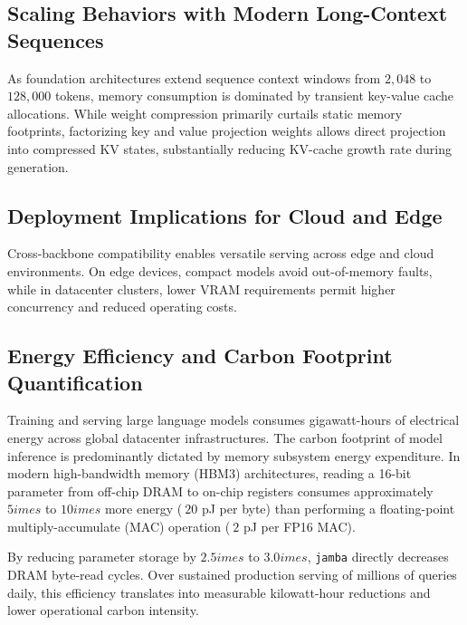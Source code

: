 \subsection{Scaling Behaviors with Modern Long-Context Sequences}
As foundation architectures extend sequence context windows from $2{,}048$ to $128{,}000$ tokens, memory consumption is dominated by transient key-value cache allocations. While weight compression primarily curtails static memory footprints, factorizing key and value projection weights allows direct projection into compressed KV states, substantially reducing KV-cache growth rate during generation.

\subsection{Deployment Implications for Cloud and Edge}
Cross-backbone compatibility enables versatile serving across edge and cloud environments. On edge devices, compact models avoid out-of-memory faults, while in datacenter clusters, lower VRAM requirements permit higher concurrency and reduced operating costs.

\subsection{Energy Efficiency and Carbon Footprint Quantification}
Training and serving large language models consumes gigawatt-hours of electrical energy across global datacenter infrastructures. The carbon footprint of model inference is predominantly dictated by memory subsystem energy expenditure. In modern high-bandwidth memory (HBM3) architectures, reading a 16-bit parameter from off-chip DRAM to on-chip registers consumes approximately $5	imes$ to $10	imes$ more energy ($~20$ pJ per byte) than performing a floating-point multiply-accumulate (MAC) operation ($~2$ pJ per FP16 MAC).

By reducing parameter storage by $2.5	imes$ to $3.0	imes$, \texttt{jamba} directly decreases DRAM byte-read cycles. Over sustained production serving of millions of queries daily, this efficiency translates into measurable kilowatt-hour reductions and lower operational carbon intensity.
